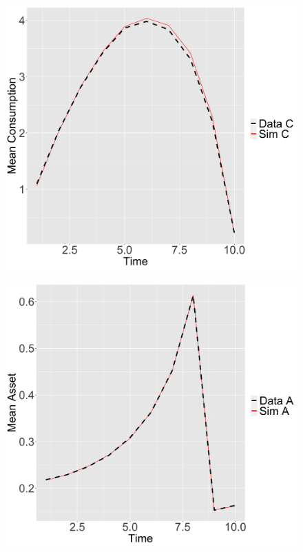 \documentclass[paper=a4, fontsize=13pt]{extarticle} %
\numberwithin{equation}{section} %
\numberwithin{figure}{section} %
\numberwithin{table}{section} %
\begin{document}
\begin{figure}[H]
\centering
\includegraphics[width=0.6\linewidth]{modelFitCons}
\label{fig:modelfitcons}
\end{figure}
\begin{figure}[H]
\centering
\includegraphics[width=0.6\linewidth]{modelFitAssets}
\label{fig:modelfitassets}
\end{figure}
\end{document}
